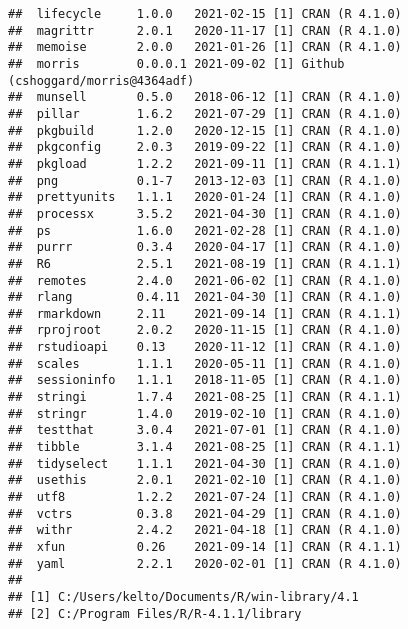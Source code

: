 \documentclass[
]{article}
\begin{document}
\begin{verbatim}
##  lifecycle     1.0.0   2021-02-15 [1] CRAN (R 4.1.0)                   
##  magrittr      2.0.1   2020-11-17 [1] CRAN (R 4.1.0)                   
##  memoise       2.0.0   2021-01-26 [1] CRAN (R 4.1.0)                   
##  morris        0.0.0.1 2021-09-02 [1] Github (cshoggard/morris@4364adf)
##  munsell       0.5.0   2018-06-12 [1] CRAN (R 4.1.0)                   
##  pillar        1.6.2   2021-07-29 [1] CRAN (R 4.1.0)                   
##  pkgbuild      1.2.0   2020-12-15 [1] CRAN (R 4.1.0)                   
##  pkgconfig     2.0.3   2019-09-22 [1] CRAN (R 4.1.0)                   
##  pkgload       1.2.2   2021-09-11 [1] CRAN (R 4.1.1)                   
##  png           0.1-7   2013-12-03 [1] CRAN (R 4.1.0)                   
##  prettyunits   1.1.1   2020-01-24 [1] CRAN (R 4.1.0)                   
##  processx      3.5.2   2021-04-30 [1] CRAN (R 4.1.0)                   
##  ps            1.6.0   2021-02-28 [1] CRAN (R 4.1.0)                   
##  purrr         0.3.4   2020-04-17 [1] CRAN (R 4.1.0)                   
##  R6            2.5.1   2021-08-19 [1] CRAN (R 4.1.1)                   
##  remotes       2.4.0   2021-06-02 [1] CRAN (R 4.1.0)                   
##  rlang         0.4.11  2021-04-30 [1] CRAN (R 4.1.0)                   
##  rmarkdown     2.11    2021-09-14 [1] CRAN (R 4.1.1)                   
##  rprojroot     2.0.2   2020-11-15 [1] CRAN (R 4.1.0)                   
##  rstudioapi    0.13    2020-11-12 [1] CRAN (R 4.1.0)                   
##  scales        1.1.1   2020-05-11 [1] CRAN (R 4.1.0)                   
##  sessioninfo   1.1.1   2018-11-05 [1] CRAN (R 4.1.0)                   
##  stringi       1.7.4   2021-08-25 [1] CRAN (R 4.1.1)                   
##  stringr       1.4.0   2019-02-10 [1] CRAN (R 4.1.0)                   
##  testthat      3.0.4   2021-07-01 [1] CRAN (R 4.1.0)                   
##  tibble        3.1.4   2021-08-25 [1] CRAN (R 4.1.1)                   
##  tidyselect    1.1.1   2021-04-30 [1] CRAN (R 4.1.0)                   
##  usethis       2.0.1   2021-02-10 [1] CRAN (R 4.1.0)                   
##  utf8          1.2.2   2021-07-24 [1] CRAN (R 4.1.0)                   
##  vctrs         0.3.8   2021-04-29 [1] CRAN (R 4.1.0)                   
##  withr         2.4.2   2021-04-18 [1] CRAN (R 4.1.0)                   
##  xfun          0.26    2021-09-14 [1] CRAN (R 4.1.1)                   
##  yaml          2.2.1   2020-02-01 [1] CRAN (R 4.1.0)                   
## 
## [1] C:/Users/kelto/Documents/R/win-library/4.1
## [2] C:/Program Files/R/R-4.1.1/library
\end{verbatim}
\end{document}
